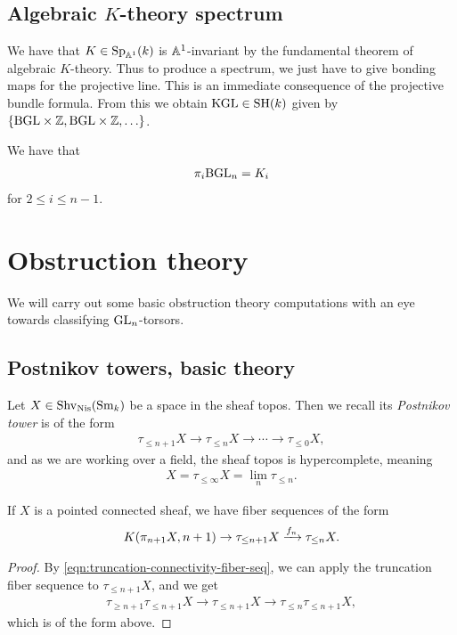 \documentclass[11pt,openany]{book}
\begin{document}
\subsection{Algebraic $K$-theory spectrum}


We have that $K \in \mathrm{Sp}_{\mathbb{A}^1}(k)$ is $\mathbb{A}^1$-invariant by the fundamental theorem of algebraic $K$-theory. Thus to produce a spectrum, we just have to give bonding maps for the projective line. This is an immediate consequence of the projective bundle formula. From this we obtain $\mathrm{KGL} \in \mathrm{SH}(k)$ given by $\left\{ \mathrm{BGL} \times \mathbb{Z}, \mathrm{BGL} \times \mathbb{Z}, \ldots \right\}$.


\begin{corollary} \cite[6.15]{AE}
We have that
\begin{align*}
    \pi_i \mathrm{BGL}_n = K_i
\end{align*}
for $2\le i\le n-1$.
\end{corollary}


\section{Obstruction theory}

We will carry out some basic obstruction theory computations with an eye towards classifying $\mathrm{GL}_n$-torsors. 

\subsection{Postnikov towers, basic theory}

Let $X \in \mathrm{Shv}_{\mathrm{Nis}}(\mathrm{Sm}_k)$ be a space in the sheaf topos. Then we recall its \textit{Postnikov tower} is of the form
\begin{align*}
    \tau_{\le n+1} X\to \tau_{\le n} X\to \cdots \to \tau_{\le 0}X,
\end{align*}
and as we are working over a field, the sheaf topos is hypercomplete, meaning
\begin{align*}
    X = \tau_{\le \infty} X = \lim_n \tau_{\le n}.
\end{align*}
%
\begin{proposition} If $X$ is a pointed connected sheaf, we have fiber sequences of the form
\begin{align*}
    K(\pi_{n+1} X, n+1) \to \tau_{\le n+1} X \xrightarrow{f_n} \tau_{\le n} X.
\end{align*}
\end{proposition}
\begin{proof} By \autoref{eqn:truncation-connectivity-fiber-seq}, we can apply the truncation fiber sequence to $\tau_{\le n+1} X$, and we get
\begin{align*}
    \tau_{\ge n+1} \tau_{\le n+1}X \to \tau_{\le n+1} X \to \tau_{\le n} \tau_{\le n+1} X,
\end{align*}
which is of the form above.
\end{proof}
\end{document}
